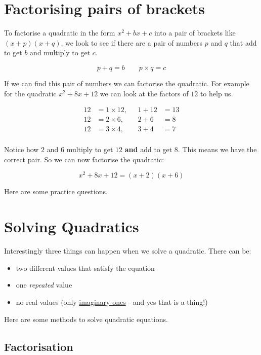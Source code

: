 \documentclass[
  a4paper,
]{scrbook}
\providecommand{\tightlist}{%
  \setlength{\itemsep}{0pt}\setlength{\parskip}{0pt}}
\begin{document}
\section{Factorising pairs of
brackets}\label{factorising-pairs-of-brackets}

To factorise a quadratic in the form \(x^2 +bx +c\) into a pair of
brackets like \((x+p)(x+q)\), we look to see if there are a pair of
numbers \(p\) and \(q\) that add to get \(b\) and multiply to get \(c\).

\[
p+q = b \quad \quad p \times q = c
\]

If we can find this pair of numbers we can factorise the quadratic. For
example for the quadratic \(x^2 + 8x +12\) we can look at the factors of
\(12\) to help us.

\[
\begin{aligned} 12 &= 1 \times 12, &\ \  \  1+12 &= 13\\
12 &= 2 \times 6, &\ \  \  2+6 &= 8\\
12 &= 3 \times 4, &\ \  \  3+4 &= 7\\
\end{aligned}
\]

Notice how \(2\) and \(6\) multiply to get \(12\) \textbf{and} add to
get \(8\). This means we have the correct pair. So we can now factorise
the quadratic:

\[
x^2 + 8x +12 = (x+2)(x+6)
\]

Here are some practice questions.

\section{Solving Quadratics}\label{solving-quadratics}

Interestingly three things can happen when we solve a quadratic. There
can be:

\begin{itemize}
\tightlist
\item
  two different values that satisfy the equation
\item
  one \emph{repeated} value
\item
  no real values (only
  \href{https://en.wikipedia.org/wiki/Imaginary_number}{imaginary ones}
  - and yes that is a thing!)
\end{itemize}

Here are some methods to solve quadratic equations.

\subsection{Factorisation}\label{factorisation}
\end{document}
